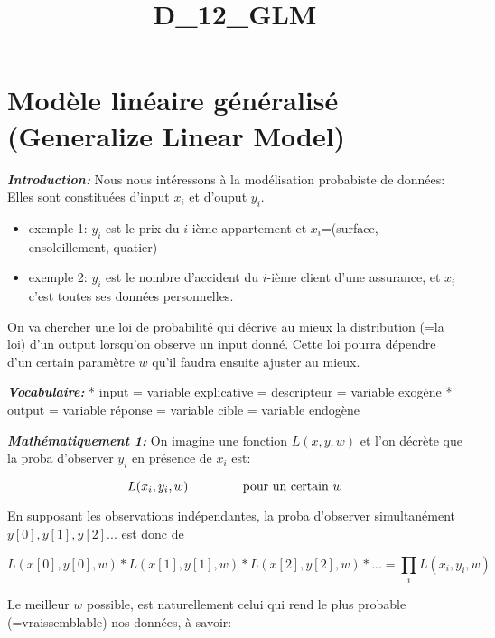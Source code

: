 \documentclass[11pt]{article}
\title{D\_12\_GLM}
\providecommand{\tightlist}{%
      \setlength{\itemsep}{0pt}\setlength{\parskip}{0pt}}
\begin{document}
    
    
    \maketitle
    
    

    
    \hypertarget{moduxe8le-linuxe9aire-guxe9nuxe9ralisuxe9-generalize-linear-model}{%
\section{Modèle linéaire généralisé (Generalize Linear
Model)}\label{moduxe8le-linuxe9aire-guxe9nuxe9ralisuxe9-generalize-linear-model}}

\textbf{\emph{Introduction:}} Nous nous intéressons à la modélisation
probabiste de données: Elles sont constituées d'input \(x_i\) et d'ouput
\(y_i\).

\begin{itemize}
\tightlist
\item
  exemple 1: \(y_i\) est le prix du \(i\)-ième appartement et
  \(x_i\)=(surface, ensoleillement, quatier)
\item
  exemple 2: \(y_i\) est le nombre d'accident du \(i\)-ième client d'une
  assurance, et \(x_i\) c'est toutes ses données personnelles.
\end{itemize}

On va chercher une loi de probabilité qui décrive au mieux la
distribution (=la loi) d'un output lorsqu'on observe un input donné.
Cette loi pourra dépendre d'un certain paramètre \(w\) qu'il faudra
ensuite ajuster au mieux.

\textbf{\emph{Vocabulaire:}} * input = variable explicative =
descripteur = variable exogène * output = variable réponse = variable
cible = variable endogène

\textbf{\emph{Mathématiquement 1:}} On imagine une fonction \(L(x,y,w)\)
et l'on décrète que la proba d'observer \(y_i\) en présence de \(x_i\)
est:

\[
        L( x_i , y_i , w )     \qquad   \qquad  \hbox{ pour un certain } w
\]

En supposant les observations indépendantes, la proba d'observer
simultanément \(y[0],y[1],y[2]...\) est donc de

\[
      L(x[0],y[0],w) * L(x[1],y[1],w) * L(x[2],y[2],w) * ... = \prod_i  L( x_i , y_i , w ) 
\]

Le meilleur \(w\) possible, est naturellement celui qui rend le plus
probable (=vraissemblable) nos données, à savoir:
\end{document}
